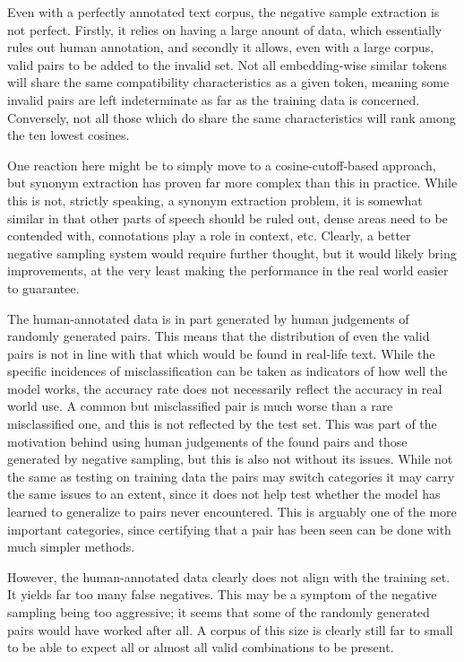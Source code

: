 \documentclass[a4paper, 12pt]{article}
\begin{document}
Even with a perfectly annotated text corpus, the negative sample extraction is not perfect. Firstly, it relies on having a large anount of data, which essentially rules out human annotation, and secondly it allows, even with a large corpus, valid pairs to be added to the invalid set. Not all embedding-wise similar tokens will share the same compatibility characteristics as a given token, meaning some invalid pairs are left indeterminate as far as the training data is concerned. Conversely, not all those which do share the same characteristics will rank among the ten lowest cosines.

One reaction here might be to simply move to a cosine-cutoff-based approach, but synonym extraction has proven far more complex than this in practice. While this is not, strictly speaking, a synonym extraction problem, it is somewhat similar in that other parts of speech should be ruled out, dense areas need to be contended with, connotations play a role in context, etc. Clearly, a better negative sampling system would require further thought, but it would likely bring improvements, at the very least making the performance in the real world easier to guarantee.

The human-annotated data is in part generated by human judgements of randomly generated pairs. This means that the distribution of even the valid pairs is not in line with that which would be found in real-life text. While the specific incidences of misclassification can be taken as indicators of how well the model works, the accuracy rate does not necessarily reflect the accuracy in real world use. A common but misclassified pair is much worse than a rare misclassified one, and this is not reflected by the test set. This was part of the motivation behind using human judgements of the found pairs and those generated by negative sampling, but this is also not without its issues. While not the same as testing on training data \textemdash the pairs may switch categories \textemdash it may carry the same issues to an extent, since it does not help test whether the model has learned to generalize to pairs never encountered. This is arguably one of the more important categories, since certifying that a pair has been seen can be done with much simpler methods.

However, the human-annotated data clearly does not align with the training set. It yields far too many false negatives. This may be a symptom of the negative sampling being too aggressive; it seems that some of the randomly generated pairs would have worked after all. A corpus of this size is clearly still far to small to be able to expect all or almost all valid combinations to be present.
\end{document}
